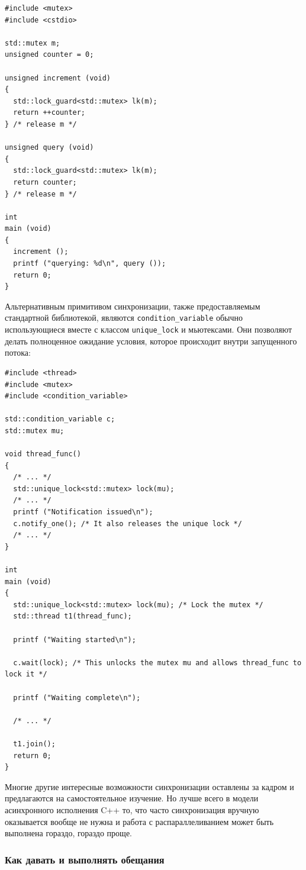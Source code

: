 \documentclass[a4paper,12pt,oneside]{article}
\begin{document}
\begin{lstlisting}
#include <mutex>
#include <cstdio>

std::mutex m;
unsigned counter = 0;

unsigned increment (void)
{
  std::lock_guard<std::mutex> lk(m);
  return ++counter;
} /* release m */

unsigned query (void)
{
  std::lock_guard<std::mutex> lk(m);
  return counter;
} /* release m */

int
main (void)
{
  increment ();
  printf ("querying: %d\n", query ());
  return 0;
}
\end{lstlisting}

Альтернативным примитивом синхронизации, также предоставляемым стандартной библиотекой, являются \lstinline!condition_variable! обычно использующиеся вместе с классом \lstinline!unique_lock! и мьютексами. Они позволяют делать полноценное ожидание условия, которое происходит внутри запущенного потока:

\begin{lstlisting}
#include <thread>
#include <mutex>
#include <condition_variable>

std::condition_variable c;
std::mutex mu;

void thread_func()
{
  /* ... */
  std::unique_lock<std::mutex> lock(mu);
  /* ... */
  printf ("Notification issued\n");
  c.notify_one(); /* It also releases the unique lock */
  /* ... */
}

int
main (void)
{
  std::unique_lock<std::mutex> lock(mu); /* Lock the mutex */
  std::thread t1(thread_func);

  printf ("Waiting started\n");

  c.wait(lock); /* This unlocks the mutex mu and allows thread_func to lock it */

  printf ("Waiting complete\n");

  /* ... */

  t1.join();
  return 0;
}
\end{lstlisting}

Многие другие интересные возможности синхронизации оставлены за кадром и предлагаются на самостоятельное изучение.
Но лучше всего в модели асинхронного исполнения C++ то, что часто синхронизация вручную оказывается вообще не нужна и работа с распараллеливанием может быть выполнена гораздо, гораздо проще. 

\subsubsection{Как давать и выполнять обещания}
\end{document}
